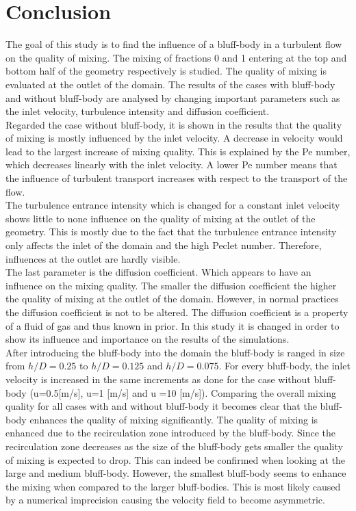 \documentclass{CFD2017}
\begin{document}
\section{Conclusion}
The goal of this study is to find the influence of a bluff-body in a turbulent flow on the quality of mixing. The mixing of fractions 0 and 1 entering at the top and bottom half of the geometry respectively is studied. The quality of mixing is evaluated at the outlet of the domain.  The results of the cases with bluff-body and without bluff-body are analysed by changing important parameters such as the inlet velocity, turbulence intensity and diffusion coefficient.\\
Regarded the case without bluff-body, it is shown in the results that the quality of mixing is mostly influenced by the inlet velocity. A decrease in velocity would lead to the largest increase of mixing quality. This is explained by the Pe number, which decreases linearly with the inlet velocity. A lower Pe number means that the influence of turbulent transport increases with respect to the transport of the flow.\\
The turbulence entrance intensity which is changed for a constant inlet velocity shows little to none influence on the quality of mixing at the outlet of the geometry. This is mostly due to the fact that the turbulence entrance intensity only affects the inlet of the domain and the high Peclet number. Therefore, influences at the outlet are hardly visible.\\
The last parameter is the diffusion coefficient. Which appears to have an influence on the mixing quality. The smaller the diffusion coefficient the higher the quality of mixing at the outlet of the domain. However, in normal practices the diffusion coefficient is not to be altered. The diffusion coefficient is a property of a fluid of gas and thus known in prior. In this study it is changed in order to show its influence and importance on the results of the simulations.\\
After introducing the bluff-body into the domain the bluff-body is ranged in size from $h/D=0.25 $ to $h/D=0.125 $ and $h/D=0.075$. For every bluff-body, the inlet velocity is increased in the same increments as done for the case without bluff-body (u=0.5[m/s], u=1 [m/s] and u =10 [m/s]). Comparing the overall mixing quality for all cases with and without bluff-body it becomes clear that the bluff-body enhances the quality of mixing significantly. The quality of mixing is enhanced due to the recirculation zone introduced by the bluff-body. Since the recirculation zone decreases as the size of the bluff-body gets smaller the quality of mixing is expected to drop. This can indeed be confirmed when looking at the large and medium bluff-body. However, the smallest bluff-body seems to enhance the mixing when compared to the larger bluff-bodies. This is most likely caused by a numerical imprecision causing the velocity field to become asymmetric.
\end{document}
